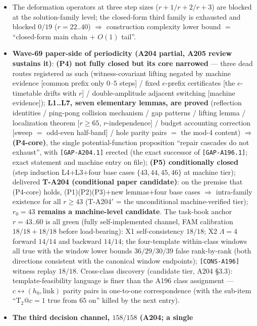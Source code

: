 \begin{itemize}
not at the canonical-trajectory level (A197-N5: the earlier ``$5..23$
steps'' has no on-disk record; the independent corroboration is $5..165$).
\item The deformation operators at three step sizes ($r+1/r+2/r+3$) are
blocked at the solution-family level; the closed-form third family is
exhausted and blocked $0/19$ ($r=22..40$) $\Rightarrow$ construction
complexity lower bound $=$ ``closed-form main chain $+$ $O(1)$ tail''.
\item \textbf{Wave-69 paper-side of periodicity (A204 partial, A205 review
sustains it)}: \textbf{(P4) not fully closed but its core narrowed} --- three
dead routes registered as such (witness-covariant lifting negated by machine
evidence [common prefix only $0$--$5$ steps] / fixed $e$-prefix certificates
[the $e$-timetable drifts with $r$] / double-amplitude adjacent switching
[machine evidence]); \textbf{L1..L7, seven elementary lemmas, are proved}
(reflection identities / ping-pong collision mechanism / gap patterns /
lifting lemma / localization theorem [$r\ge65$, $r$-independence] / budget
accounting correction [sweep $=$ odd-even half-band] / hole parity pairs
$=$ the mod-4 content) $\Rightarrow$ \textbf{(P4-core)}, the single
potential-function proposition ``repair cascades do not exhaust'', with
\texttt{[GAP-A204.1]} erected (the exact successor of \texttt{[GAP-A196.1]};
exact statement and machine entry on file); \textbf{(P5) conditionally
closed} (step induction L4$+$L3$+$four base cases $\{43,44,45,46\}$ at
machine tier); delivered \textbf{T-A204 (conditional paper candidate)}: on
the premise that (P4-core) holds, (P1)(P2)(P3)$+$new lemmas$+$four base
cases $\Rightarrow$ intra-family existence for all $r\ge43$
(T-A204$'$ = the unconditional machine-verified tier); \textbf{$r_0=43$
remains a machine-level candidate}. The task-book anchor $r=43..60$ is all
green (fully self-implemented channel, FAM calibration $18/18+18/18$ before
load-bearing): X1 self-consistency $18/18$; X2 $\Lambda=4$ forward $14/14$
and backward $14/14$; the four-template within-class windows all true with
the window lower bounds $36/29/30/39$ false rank-by-rank (both directions
consistent with the canonical window endpoints); \texttt{[CONS-A196]}
witness replay $18/18$. Cross-class discovery (candidate tier, A204 \S3.3):
template-feasibility language is finer than the A196 class assignment ---
$c\leftrightarrow(h_0,\mathrm{link})$ parity pairs in one-to-one
correspondence (with the sub-item ``T$_2@c=1$ true from $65$ on'' killed by
the next entry).
\item \textbf{The third decision channel, $158/158$ (A204; a single
}
\end{itemize}
